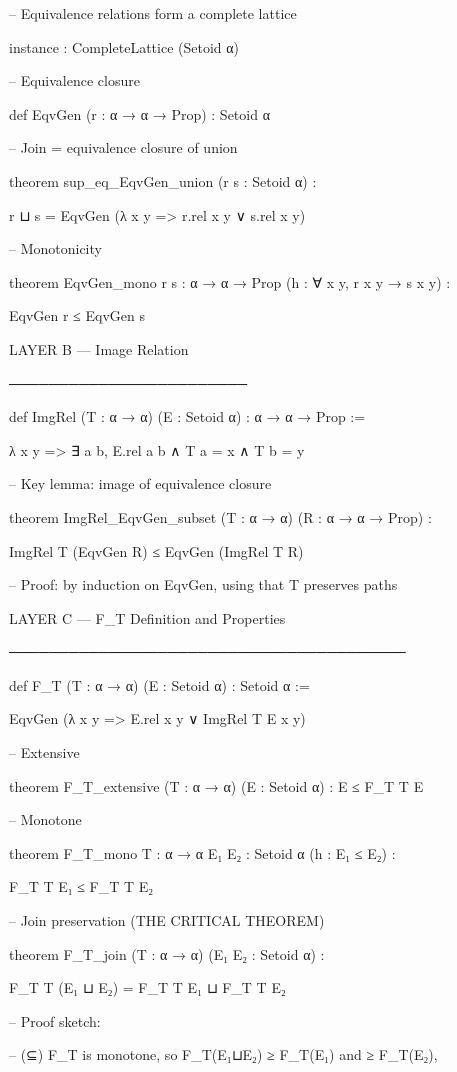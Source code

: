 -- Equivalence relations form a complete lattice

instance : CompleteLattice (Setoid α)


-- Equivalence closure

def EqvGen (r : α → α → Prop) : Setoid α


-- Join = equivalence closure of union

theorem sup_eq_EqvGen_union (r s : Setoid α) :

r ⊔ s = EqvGen (λ x y => r.rel x y ∨ s.rel x y)


-- Monotonicity

theorem EqvGen_mono {r s : α → α → Prop} (h : ∀ x y, r x y → s x y) :

EqvGen r ≤ EqvGen s


LAYER B — Image Relation

────────────────────────

def ImgRel (T : α → α) (E : Setoid α) : α → α → Prop :=

λ x y => ∃ a b, E.rel a b ∧ T a = x ∧ T b = y


-- Key lemma: image of equivalence closure

theorem ImgRel_EqvGen_subset (T : α → α) (R : α → α → Prop) :

ImgRel T (EqvGen R) ≤ EqvGen (ImgRel T R)


-- Proof: by induction on EqvGen, using that T preserves paths


LAYER C — F_T Definition and Properties

────────────────────────────────────────

def F_T (T : α → α) (E : Setoid α) : Setoid α :=

EqvGen (λ x y => E.rel x y ∨ ImgRel T E x y)


-- Extensive

theorem F_T_extensive (T : α → α) (E : Setoid α) : E ≤ F_T T E


-- Monotone

theorem F_T_mono {T : α → α} {E₁ E₂ : Setoid α} (h : E₁ ≤ E₂) :

F_T T E₁ ≤ F_T T E₂


-- Join preservation (THE CRITICAL THEOREM)

theorem F_T_join (T : α → α) (E₁ E₂ : Setoid α) :

F_T T (E₁ ⊔ E₂) = F_T T E₁ ⊔ F_T T E₂


-- Proof sketch:

-- (⊆) F_T is monotone, so F_T(E₁⊔E₂) ≥ F_T(E₁) and ≥ F_T(E₂),

